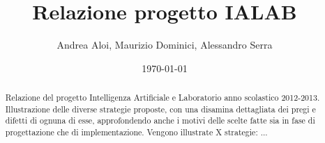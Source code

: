 \documentclass[a4paper,12pt]{article}
\title{Relazione progetto IALAB}
\author{Andrea Aloi, Maurizio Dominici, Alessandro Serra}
\date{\today}
\begin{document}
\maketitle
 
\begin{abstract}
Relazione del progetto Intelligenza Artificiale e Laboratorio anno scolastico 2012-2013.
Illustrazione delle diverse strategie proposte, con una disamina dettagliata dei pregi e difetti di ognuna di esse, approfondendo anche i motivi delle scelte fatte sia in fase di progettazione che di implementazione. Vengono illustrate X strategie: ...
\end{abstract}

\newpage
 
\tableofcontents
 
\end{document}
